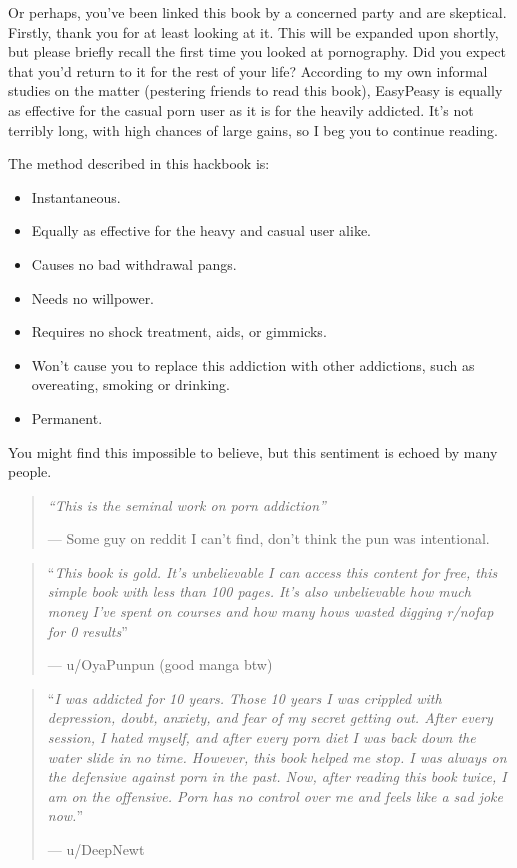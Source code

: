 \documentclass[
]{book}
\begin{document}
Or perhaps, you've been linked this book by a concerned party and are skeptical. Firstly, thank you for at least looking at it. This will be expanded upon shortly, but please briefly recall the first time you looked at pornography. Did you expect that you'd return to it for the rest of your life? According to my own informal studies on the matter (pestering friends to read this book), EasyPeasy is equally as effective for the casual porn user as it is for the heavily addicted. It's not terribly long, with high chances of large gains, so I beg you to continue reading.

The method described in this hackbook is:

\begin{itemize}
\item
  Instantaneous.
\item
  Equally as effective for the heavy and casual user alike.
\item
  Causes no bad withdrawal pangs.
\item
  Needs no willpower.
\item
  Requires no shock treatment, aids, or gimmicks.
\item
  Won't cause you to replace this addiction with other addictions, such as overeating, smoking or drinking.
\item
  Permanent.
\end{itemize}

You might find this impossible to believe, but this sentiment is echoed by many people.

\begin{quote}
\emph{``This is the seminal work on porn addiction''}

--- Some guy on reddit I can't find, don't think the pun was intentional.
\end{quote}

\begin{quote}
``\emph{This book is gold. It's unbelievable I can access this content for free, this simple book with less than 100 pages. It's also unbelievable how much money I've spent on courses and how many hows wasted digging r/nofap for 0 results}''

--- u/OyaPunpun (good manga btw)
\end{quote}

\begin{quote}
``\emph{I was addicted for 10 years. Those 10 years I was crippled with depression, doubt, anxiety, and fear of my secret getting out. After every session, I hated myself, and after every porn diet I was back down the water slide in no time. However, this book helped me stop. I was always on the defensive against porn in the past. Now, after reading this book twice, I am on the offensive. Porn has no control over me and feels like a sad joke now.}''

--- u/DeepNewt
\end{quote}
\end{document}
